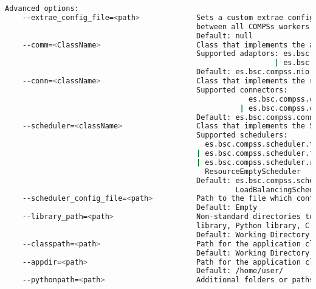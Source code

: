 \begin{lstlisting}[language=bash]
  Advanced options:
    --extrae_config_file=<path>             Sets a custom extrae config file. Must be in a shared disk
                                            between all COMPSs workers.
                                            Default: null
    --comm=<ClassName>                      Class that implements the adaptor for communications
                                            Supported adaptors: es.bsc.compss.nio.master.NIOAdaptor
                                                              | es.bsc.compss.gat.master.GATAdaptor
                                            Default: es.bsc.compss.nio.master.NIOAdaptor
    --conn=<className>                      Class that implements the runtime connector for the cloud
                                            Supported connectors: 
                                                        es.bsc.compss.connectors.DefaultSSHConnector
                                                      | es.bsc.compss.connectors.DefaultNoSSHConnector
                                            Default: es.bsc.compss.connectors.DefaultSSHConnector
    --scheduler=<className>                 Class that implements the Scheduler for COMPSs
                                            Supported schedulers: 
                                              es.bsc.compss.scheduler.fullGraphScheduler.FullGraphScheduler
                                            | es.bsc.compss.scheduler.fifoScheduler.FIFOScheduler
                                            | es.bsc.compss.scheduler.resourceEmptyScheduler.
                                              ResourceEmptyScheduler
                                            Default: es.bsc.compss.scheduler.loadBalancingScheduler.
                                                     LoadBalancingScheduler
    --scheduler_config_file=<path>          Path to the file which contains the scheduler configuration.
                                            Default: Empty
    --library_path=<path>                   Non-standard directories to search for libraries (e.g. Java JVM
                                            library, Python library, C binding library)
                                            Default: Working Directory
    --classpath=<path>                      Path for the application classes / modules
                                            Default: Working Directory
    --appdir=<path>                         Path for the application class folder.
                                            Default: /home/user/
    --pythonpath=<path>                     Additional folders or paths to add to the PYTHONPATH

\end{lstlisting}
